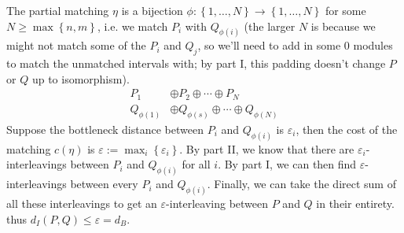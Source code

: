 \documentclass[twoside,10pt]{article}
\begin{document}
The partial matching $\eta$ is a bijection $\phi:\left\{ 1, \dots, N \right\}\to \left\{ 1, \dots, N \right\}$ for some $N \geq \max\left\{ n,m \right\}$, i.e. we match $P_i$ with $Q_{\phi(i)}$ (the larger $N$ is because we might not match some of the $P_i$ and $Q_j$, so we'll need to add in some 0 modules to match the unmatched intervals with; by part I, this padding doesn't change $P$ or $Q$ up to isomorphism).
\begin{align*}
	P_1 &\oplus P_2 \oplus \cdots \oplus P_N \\
	Q_{\phi(1)} &\oplus Q_{\phi(s)} \oplus \cdots \oplus Q_{\phi(N)}
\end{align*}
Suppose the bottleneck distance between $P_i$ and $Q_{\phi(i)}$ is $\varepsilon_i$, then the cost of the matching $c(\eta)$ is $\varepsilon := \max_i \left\{ \varepsilon_i \right\}$. By part II, we know that there are $\varepsilon_i$-interleavings between $P_i$ and $Q_{\phi(i)}$ for all $i$. By part I, we can then find $\varepsilon$-interleavings between every $P_i$ and $Q_{\phi(i)}$. Finally, we can take the direct sum of all these interleavings to get an $\varepsilon$-interleaving between $P$ and $Q$ in their entirety. thus $d_I(P,Q) \leq \varepsilon = d_{B}$.
\end{document}

